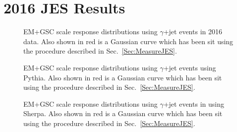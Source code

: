 \chapter{2016 JES Results}
\label{App:2016}

\begin{figure}[!ht]
  \begin{center}
  \end{center}
  \caption[EM scale response distributions in data using $\gamma$+jet in 2016]
  {\small EM+GSC scale response distributions using $\gamma$+jet events in 2016 data.  Also shown in red is a Gaussian curve which has been sit using the procedure described in Sec.~\ref{Sec:MeasureJES}. }
  \label{plot:GJetEM2016DataDistsApp}
\end{figure}

\begin{figure}[!ht]
  \begin{center}
  \end{center}
  \caption[EM scale response distributions in Pythia using $\gamma$+jet in 2016]
  {\small EM+GSC scale response distributions using $\gamma$+jet events using Pythia.  Also shown in red is a Gaussian curve which has been sit using the procedure described in Sec.~\ref{Sec:MeasureJES}. }
  \label{plot:GJetEM2016PythiaistsApp}
\end{figure}

\begin{figure}[!ht]
  \begin{center}
  \end{center}
  \caption[EM scale response distributions in Sherpa using $\gamma$+jet in 2016]
  {\small EM+GSC scale response distributions using $\gamma$+jet events in using Sherpa.  Also shown in red is a Gaussian curve which has been sit using the procedure described in Sec.~\ref{Sec:MeasureJES}. }
  \label{plot:GJetEM2016SherpaDistsApp}
\end{figure}

